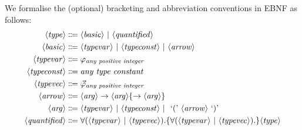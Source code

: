 We formalise the (optional) bracketing and abbreviation conventions in EBNF as follows:
\begin{align*}
    \langle\mathit{type}\rangle &\Coloneqq \langle\mathit{basic}\rangle \ |\  \langle\mathit{quantified}\rangle \\
    \langle\mathit{basic}\rangle &\Coloneqq \langle\mathit{typevar}\rangle \ |\  \langle\mathit{typeconst}\rangle \ |\  \langle\mathit{arrow}\rangle \\
    \langle\mathit{typevar}\rangle &\Coloneqq \varphi_{\textit{any positive integer}} \\
    \langle\mathit{typeconst}\rangle &\Coloneqq \textit{any type constant} \\
    \langle\mathit{typevec}\rangle &\Coloneqq \Vec{\varphi}_{\textit{any positive integer}} \\
    \langle\mathit{arrow}\rangle &\Coloneqq \langle\mathit{arg}\rangle \rightarrow \langle\mathit{arg}\rangle \{\rightarrow \langle\mathit{arg}\rangle\} \\
    \langle\mathit{arg}\rangle &\Coloneqq \langle\mathit{typevar}\rangle \ |\  \langle\mathit{typeconst}\rangle \ |\  \text{ `(' } \langle\mathit{arrow}\rangle \text{ `)' } \\
    \langle\mathit{quantified}\rangle &\Coloneqq \forall (\langle\mathit{typevar}\rangle \ |\  \langle\mathit{typevec}\rangle). \{\forall (\langle\mathit{typevar}\rangle \ |\  \langle\mathit{typevec}\rangle).\} \langle\mathit{type}\rangle
\end{align*}

